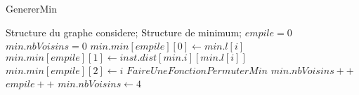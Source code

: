 \documentclass[11pt]{ctexart}
\begin{document}
\renewcommand{\thealgorithm}{} %
    \begin{algorithm}
        \caption{GenererMin} %
        \begin{algorithmic}[1] %
            \Require Structure du graphe considere;
                    Structure de minimum;
            \State $empile = 0$
            \State $min.nbVoisins = 0$
                \State $min.min[empile][0] \leftarrow min.l[i]$
                \State $min.min[empile][1] \leftarrow inst.dist[min.i][min.l[i]]$
                \State $min.min[empile][2] \leftarrow i$
                \State $Faire Une Fonction PermuterMin$
                        \State $min.nbVoisins ++$
                        \State $empile++$
                \EndIf
            \EndFor
                \State $min.nbVoisins \leftarrow 4$
        \end{algorithmic}
    \end{algorithm}
\end{document}
